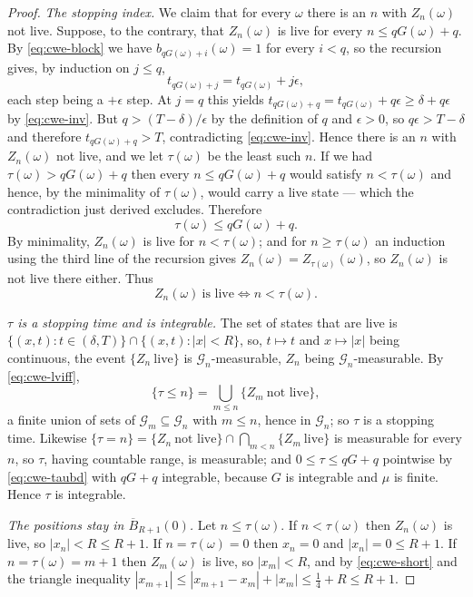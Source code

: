 \begin{proof}
\emph{The stopping index.} We claim that for every $\omega$ there is an $n$ with
$Z_n(\omega)$ not live. Suppose, to the contrary, that $Z_n(\omega)$ is live for
every $n\le qG(\omega)+q$. By \eqref{eq:cwe-block} we have
$b_{qG(\omega)+i}(\omega)=1$ for every $i<q$, so the recursion gives, by
induction on $j\le q$,
\[
  t_{qG(\omega)+j}=t_{qG(\omega)}+j\epsilon ,
\]
each step being a $+\epsilon$ step. At $j=q$ this yields
$t_{qG(\omega)+q}=t_{qG(\omega)}+q\epsilon\ge\delta+q\epsilon$ by
\eqref{eq:cwe-inv}. But $q>(T-\delta)/\epsilon$ by the definition of $q$ and
$\epsilon>0$, so $q\epsilon>T-\delta$ and therefore
$t_{qG(\omega)+q}>T$, contradicting \eqref{eq:cwe-inv}. Hence there is an $n$ with
$Z_n(\omega)$ not live, and we let $\tau(\omega)$ be the least such $n$. If we had
$\tau(\omega)>qG(\omega)+q$ then every $n\le qG(\omega)+q$ would satisfy
$n<\tau(\omega)$ and hence, by the minimality of $\tau(\omega)$, would carry a live
state --- which the contradiction just derived excludes. Therefore
\begin{equation}\label{eq:cwe-taubd}
  \tau(\omega)\le qG(\omega)+q .
\end{equation}
By minimality, $Z_n(\omega)$ is live for $n<\tau(\omega)$; and for
$n\ge\tau(\omega)$ an induction using the third line of the recursion gives
$Z_n(\omega)=Z_{\tau(\omega)}(\omega)$, so $Z_n(\omega)$ is not live there
either. Thus
\begin{equation}\label{eq:cwe-lviff}
  Z_n(\omega)\ \text{is live}\iff n<\tau(\omega).
\end{equation}

\emph{$\tau$ is a stopping time and is integrable.} The set of states that are
live is $\{(x,t):t\in(\delta,T)\}\cap\{(x,t):|x|<R\}$, so, $t\mapsto t$ and
$x\mapsto|x|$ being continuous, the event $\{Z_n\ \text{live}\}$ is
$\mathcal G_n$-measurable, $Z_n$ being $\mathcal G_n$-measurable. By
\eqref{eq:cwe-lviff},
\[
  \{\tau\le n\}=\bigcup_{m\le n}\{Z_m\ \text{not live}\},
\]
a finite union of sets of $\mathcal G_m\subseteq\mathcal G_n$ with $m\le n$,
hence in $\mathcal G_n$; so $\tau$ is a stopping time. Likewise
$\{\tau=n\}=\{Z_n\ \text{not live}\}\cap\bigcap_{m<n}\{Z_m\ \text{live}\}$ is
measurable for every $n$, so $\tau$, having countable range, is measurable;
and $0\le\tau\le qG+q$ pointwise by \eqref{eq:cwe-taubd} with $qG+q$
integrable, because $G$ is integrable and $\mu$ is finite. Hence $\tau$ is
integrable.

\emph{The positions stay in $\overline B_{R+1}(0)$.} Let $n\le\tau(\omega)$. If
$n<\tau(\omega)$ then $Z_n(\omega)$ is live, so $|x_n|<R\le R+1$. If
$n=\tau(\omega)=0$ then $x_n=0$ and $|x_n|=0\le R+1$. If
$n=\tau(\omega)=m+1$ then $Z_m(\omega)$ is live, so $|x_m|<R$, and by
\eqref{eq:cwe-short} and the triangle inequality
$|x_{m+1}|\le|x_{m+1}-x_m|+|x_m|\le\tfrac14+R\le R+1$.


\end{proof}
